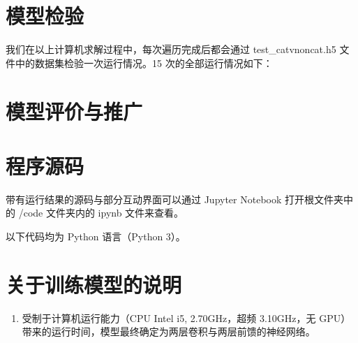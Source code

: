 \documentclass[UTF8]{ctexart}
\begin{document}
\section{模型检验}
我们在以上计算机求解过程中，每次遍历完成后都会通过 test\_catvnoncat.h5 文件中的数据集检验一次运行情况。15 次的全部运行情况如下：

\section{模型评价与推广}


\clearpage
\appendix
\appendixname
\section{程序源码}
带有运行结果的源码与部分互动界面可以通过 Jupyter Notebook 打开根文件夹中的 /code 文件夹内的 ipynb 文件来查看。

以下代码均为 Python 语言（Python 3）。

\section{关于训练模型的说明}
\begin{enumerate}
\item 受制于计算机运行能力（CPU Intel i5, 2.70GHz，超频 3.10GHz，无 GPU）带来的运行时间，模型最终确定为两层卷积与两层前馈的神经网络。
\end{enumerate}
\end{document}
